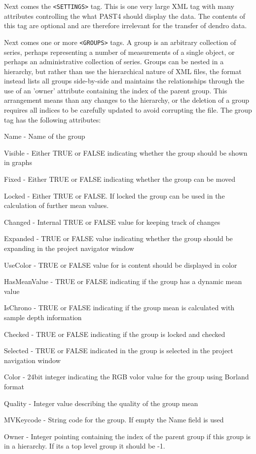 \documentclass[10pt, headsepline,DIV14,BCOR0.5cm]{scrreprt}
\begin{document}
Next comes the \verb|<SETTINGS>| tag. This is one very large XML tag with many attributes controlling the what PAST4 should display the data. The contents of this tag are optional and are therefore irrelevant for the transfer of dendro data.

Next comes one or more \verb|<GROUPS>| tags. A group is an arbitrary collection of series, perhaps representing a number of measurements of a single object, or perhaps an administrative collection of series. Groups can be nested in a hierarchy, but rather than use the hierarchical nature of XML files, the format instead lists all groups side-by-side and maintains the relationships through the use of an 'owner' attribute containing the index of the parent group. This arrangement means than any changes to the hierarchy, or the deletion of a group requires all indices to be carefully updated to avoid corrupting the file. The group tag has the following attributes:

\begin{itemize*}
    \item  Name - Name of the group
    \item  Visible - Either TRUE or FALSE indicating whether the group should be shown in graphs
    \item  Fixed - Either TRUE or FALSE indicating whether the group can be moved
    \item  Locked - Either TRUE or FALSE. If locked the group can be used in the calculation of further mean values.
    \item  Changed - Internal TRUE or FALSE value for keeping track of changes
    \item  Expanded - TRUE or FALSE value indicating whether the group should be expanding in the project navigator window
    \item  UseColor - TRUE or FALSE value for is content should be displayed in color
    \item  HasMeanValue - TRUE or FALSE indicating if the group has a dynamic mean value
    \item  IsChrono - TRUE or FALSE indicating if the group mean is calculated with sample depth information
    \item  Checked - TRUE or FALSE indicating if the group is locked and checked
    \item  Selected - TRUE or FALSE indicated in the group is selected in the project navigation window
    \item  Color - 24bit integer indicating the RGB volor value for the group using Borland format
    \item  Quality - Integer value describing the quality of the group mean
    \item  MVKeycode - String code for the group. If empty the Name field is used
    \item  Owner - Integer pointing containing the index of the parent group if this group is in a hierarchy. If its a top level group it should be -1. 
\end{itemize*}
\end{document}
